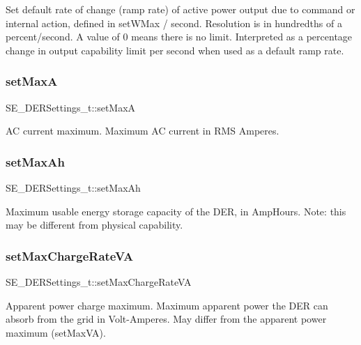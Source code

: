 Set default rate of change (ramp rate) of active power output due to command or internal action, defined in set\+W\+Max / second. Resolution is in hundredths of a percent/second. A value of 0 means there is no limit. Interpreted as a percentage change in output capability limit per second when used as a default ramp rate. \mbox{\label{group__DERSettings_ga2f8c9d376ed4b63d27652e879fa655b6}} 
\subsubsection{\texorpdfstring{set\+MaxA}{setMaxA}}
{\footnotesize\ttfamily S\+E\+\_\+\+D\+E\+R\+Settings\+\_\+t\+::set\+MaxA}

AC current maximum. Maximum AC current in R\+MS Amperes. \mbox{\label{group__DERSettings_ga8c5b2f3caab9dde5fbd59078af32e306}} 
\subsubsection{\texorpdfstring{set\+Max\+Ah}{setMaxAh}}
{\footnotesize\ttfamily S\+E\+\_\+\+D\+E\+R\+Settings\+\_\+t\+::set\+Max\+Ah}

Maximum usable energy storage capacity of the D\+ER, in Amp\+Hours. Note\+: this may be different from physical capability. \mbox{\label{group__DERSettings_gac22ce2b6b9ee46a8127b79e33a71afbb}} 
\subsubsection{\texorpdfstring{set\+Max\+Charge\+Rate\+VA}{setMaxChargeRateVA}}
{\footnotesize\ttfamily S\+E\+\_\+\+D\+E\+R\+Settings\+\_\+t\+::set\+Max\+Charge\+Rate\+VA}

Apparent power charge maximum. Maximum apparent power the D\+ER can absorb from the grid in Volt-\/\+Amperes. May differ from the apparent power maximum (set\+Max\+VA). \mbox{\label{group__DERSettings_ga1979ec0e73dd8d0c2c689be68e90580c}} 
